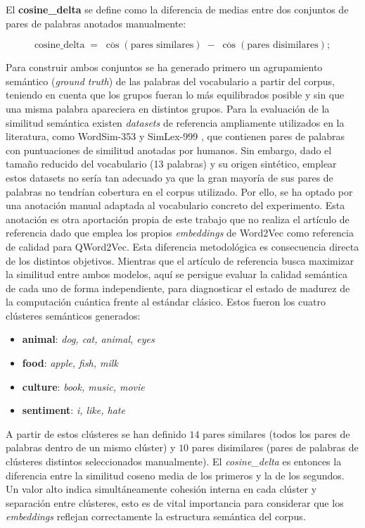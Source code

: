 El \textbf{cosine\_delta} se define como la diferencia de medias entre dos conjuntos de pares de palabras anotados manualmente:

\begin{equation*}
  \text{cosine\_delta} \;=\; \overline{\cos}(\text{pares similares}) \;-\; \overline{\cos}(\text{pares disimilares});
\end{equation*}

Para construir ambos conjuntos se ha generado primero un agrupamiento semántico (\textit{ground truth}) de las palabras del vocabulario a partir del corpus, teniendo en cuenta que los grupos fueran lo más equilibrados posible y sin que una misma palabra apareciera en distintos grupos. Para la evaluación de la similitud semántica existen \textit{datasets} de referencia ampliamente utilizados en la literatura, como WordSim-353 \cite{wordsim353_kaggle} y SimLex-999 \cite{simlex999_hill_2015}, que contienen pares de palabras con puntuaciones de similitud anotadas por humanos. Sin embargo, dado el tamaño reducido del vocabulario (13 palabras) y su origen sintético, emplear estos datasets no sería tan adecuado ya que la gran mayoría de sus pares de palabras no tendrían cobertura en el corpus utilizado. Por ello, se ha optado por una anotación manual adaptada al vocabulario concreto del experimento. Esta anotación es otra aportación propia de este trabajo que no realiza el artículo de referencia \cite{ohno_qword2vec_2025} dado que emplea los propios \textit{embeddings} de Word2Vec como referencia de calidad para QWord2Vec. Esta diferencia metodológica es consecuencia directa de los distintos objetivos. Mientras que el artículo de referencia busca maximizar la similitud entre ambos modelos, aquí se persigue evaluar la calidad semántica de cada uno de forma independiente, para diagnosticar el estado de madurez de la computación cuántica frente al estándar clásico. Estos fueron los cuatro clústeres semánticos generados:

\begin{itemize}
  \item \textbf{animal}: \textit{dog, cat, animal, eyes}
  \item \textbf{food}: \textit{apple, fish, milk}
  \item \textbf{culture}: \textit{book, music, movie}
  \item \textbf{sentiment}: \textit{i, like, hate}
\end{itemize}

A partir de estos clústeres se han definido $14$ pares similares (todos los pares de palabras dentro de un mismo clúster) y $10$ pares disimilares (pares de palabras de clústeres distintos seleccionados manualmente). El \textit{cosine\_delta} es entonces la diferencia entre la similitud coseno media de los primeros y la de los segundos. Un valor alto indica simultáneamente cohesión interna en cada clúster y separación entre clústeres, esto es de vital importancia para considerar que los \textit{embeddings} reflejan correctamente la estructura semántica del corpus.

